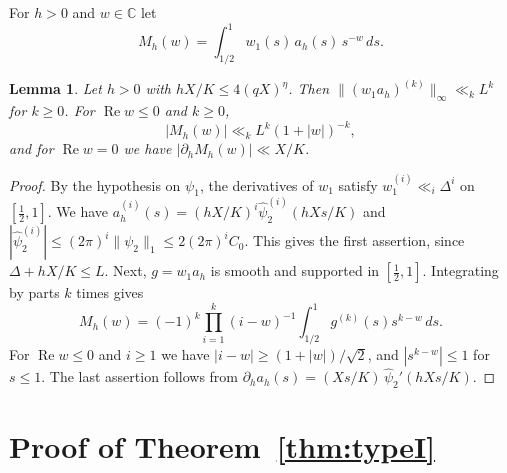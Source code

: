 \documentclass[11pt]{amsart}
\newtheorem{lemma}[theorem]{Lemma}
\theoremstyle{remark}
\theoremstyle{definition}
\numberwithin{equation}{section}
\newcommand{\C}{\mathbb{C}}
\begin{document}
For $h>0$ and $w\in\C$ let
\[
M_h(w)=\int_{1/2}^1w_1(s)\,a_h(s)\,s^{-w}\,ds.
\]

\begin{lemma}\label{lem:Mh}
Let $h>0$ with $hX/K\le4(qX)^\eta$. Then $\|(w_1a_h)^{(k)}\|_\infty\ll_kL^k$ for $k\ge0$. For $\operatorname{Re}w\le0$ and $k\ge0$,
\[
|M_h(w)|\ll_kL^k(1+|w|)^{-k},
\]
and for $\operatorname{Re}w=0$ we have $|\partial_hM_h(w)|\ll X/K$.
\end{lemma}

\begin{proof}
By the hypothesis on $\psi_1$, the derivatives of $w_1$ satisfy $w_1^{(i)}\ll_i\Delta^i$ on $[\frac12,1]$. We have $a_h^{(i)}(s)=(hX/K)^i\hat\psi_2^{(i)}(hXs/K)$ and $|\hat\psi_2^{(i)}|\le(2\pi)^i\|\psi_2\|_1\le2(2\pi)^iC_0$. This gives the first assertion, since $\Delta+hX/K\le L$. Next, $g=w_1a_h$ is smooth and supported in $[\frac12,1]$. Integrating by parts $k$ times gives
\[
M_h(w)=(-1)^k\prod_{i=1}^k(i-w)^{-1}\int_{1/2}^1g^{(k)}(s)s^{k-w}\,ds.
\]
For $\operatorname{Re}w\le0$ and $i\ge1$ we have $|i-w|\ge(1+|w|)/\sqrt2$, and $|s^{k-w}|\le1$ for $s\le1$. The last assertion follows from $\partial_ha_h(s)=(Xs/K)\,\hat\psi_2'(hXs/K)$.
\end{proof}

\section{\texorpdfstring{Proof of Theorem~\ref{thm:typeI}}{Proof of Theorem 6.1}}\label{sec:proof}
\end{document}
